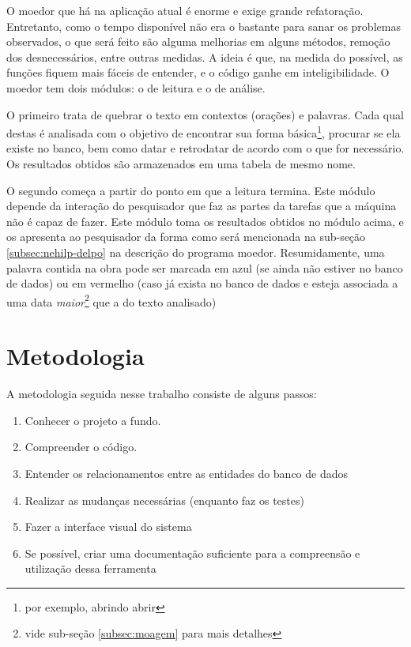 O moedor que há na aplicação atual é enorme e exige grande refatoração. Entretanto, como o tempo disponível não 
era o bastante para sanar os problemas observados, o que será feito são alguma melhorias em alguns métodos,
remoção dos desnecessários, entre outras medidas. A ideia é que, na medida do possível, as funções fiquem mais
fáceis de entender, e o código ganhe em inteligibilidade. O moedor tem dois módulos: o de leitura e o de análise.

O primeiro trata de quebrar o texto em contextos (orações) e palavras. Cada qual destas é analisada com o
objetivo de encontrar sua forma básica\footnote{por exemplo, abrindo \dir abrir}, procurar se ela existe no
banco, bem como datar e retrodatar de acordo com o que for necessário. Os resultados obtidos são armazenados
em uma tabela de mesmo nome.

O segundo começa a partir do ponto em que a leitura termina. Este módulo depende da interação do pesquisador
que faz as partes da tarefas que a máquina não é capaz de fazer. Este módulo toma os resultados obtidos no
módulo acima, e os apresenta ao pesquisador da forma como será mencionada na sub-seção \ref{subsec:nehilp-delpo}
na descrição do programa moedor. Resumidamente, uma palavra contida na obra pode ser marcada em azul (se ainda
não estiver no banco de dados) ou em vermelho (caso já exista no banco de dados e esteja associada a uma data
\emph{maior}\footnote{vide sub-seção \ref{subsec:moagem} para mais detalhes} que a do texto analisado)

\section{Metodologia}
\label{sec:methodology}

A metodologia seguida nesse trabalho consiste de alguns passos:
\begin{enumerate}
    \item Conhecer o projeto a fundo.
    \item Compreender o código.
    \item Entender os relacionamentos entre as entidades do banco de dados
    \item Realizar as mudanças necessárias (enquanto faz os testes)
    \item Fazer a interface visual do sistema
    \item Se possível, criar uma documentação suficiente para a compreensão e
    utilização dessa ferramenta
\end{enumerate}

